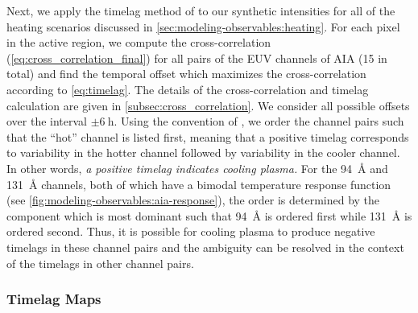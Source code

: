 Next, we apply the timelag method of \citet{viall_evidence_2012} to our synthetic intensities for all of the heating scenarios discussed in \autoref{sec:modeling-observables:heating}. For each pixel in the active region, we compute the cross-correlation (\autoref{eq:cross_correlation_final}) for all pairs of the EUV channels of AIA (15 in total) and find the temporal offset which maximizes the cross-correlation according to \autoref{eq:timelag}. The details of the cross-correlation and timelag calculation are given in \autoref{subsec:cross_correlation}. We consider all possible offsets over the interval $\pm\SI{6}{\hour}$. Using the convention of \citet{viall_evidence_2012}, we order the channel pairs such that the ``hot'' channel is listed first, meaning that a positive timelag corresponds to variability in the hotter channel followed by variability in the cooler channel. In other words, \textit{a positive timelag indicates cooling plasma.} For the \SI{94}{\angstrom} and \SI{131}{\angstrom} channels, both of which have a bimodal temperature response function (see \autoref{fig:modeling-observables:aia-response}), the order is determined by the component which is most dominant such that \SI{94}{\angstrom} is ordered first while \SI{131}{\angstrom} is ordered second. Thus, it is possible for cooling plasma to produce negative timelags in these channel pairs and the ambiguity can be resolved in the context of the timelags in other channel pairs.

\subsubsection{Timelag Maps}\label{sec:modeling-observables:timelag_maps}

